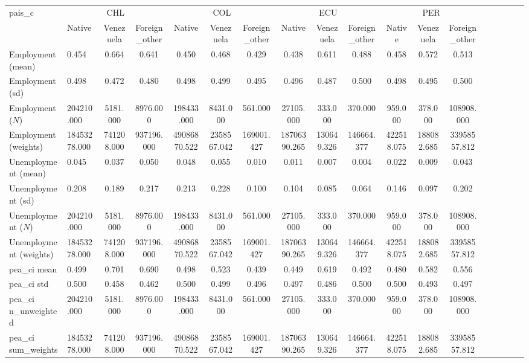 
\begin{landscape}
\begin{table}[htbp]
\centering
\scriptsize
\setlength{\tabcolsep}{3pt}
\begin{tabular}{llcccccccccccccccc}
\toprule
pais_c & \multicolumn{3}{c}{CHL} & \multicolumn{3}{c}{COL} & \multicolumn{3}{c}{ECU} & \multicolumn{3}{c}{PER} \\
 & Native & Venezuela & Foreign_other & Native & Venezuela & Foreign_other & Native & Venezuela & Foreign_other & Native & Venezuela & Foreign_other \\
\midrule
Employment (mean) & 0.454 & 0.664 & 0.641 & 0.450 & 0.468 & 0.429 & 0.438 & 0.611 & 0.488 & 0.458 & 0.572 & 0.513 \\
Employment (sd) & 0.498 & 0.472 & 0.480 & 0.498 & 0.499 & 0.495 & 0.496 & 0.487 & 0.500 & 0.498 & 0.495 & 0.500 \\
Employment ($N$) & 204210.000 & 5181.000 & 8976.000 & 198433.000 & 8431.000 & 561.000 & 27105.000 & 333.000 & 370.000 & 959.000 & 378.000 & 108908.000 \\
Employment (weights) & 18453278.000 & 741208.000 & 937196.000 & 49086870.522 & 2358567.042 & 169001.427 & 18706390.265 & 130649.326 & 146664.377 & 422518.075 & 188082.685 & 33958557.812 \\
Unemployment (mean) & 0.045 & 0.037 & 0.050 & 0.048 & 0.055 & 0.010 & 0.011 & 0.007 & 0.004 & 0.022 & 0.009 & 0.043 \\
Unemployment (sd) & 0.208 & 0.189 & 0.217 & 0.213 & 0.228 & 0.100 & 0.104 & 0.085 & 0.064 & 0.146 & 0.097 & 0.202 \\
Unemployment ($N$) & 204210.000 & 5181.000 & 8976.000 & 198433.000 & 8431.000 & 561.000 & 27105.000 & 333.000 & 370.000 & 959.000 & 378.000 & 108908.000 \\
Unemployment (weights) & 18453278.000 & 741208.000 & 937196.000 & 49086870.522 & 2358567.042 & 169001.427 & 18706390.265 & 130649.326 & 146664.377 & 422518.075 & 188082.685 & 33958557.812 \\
pea_ci mean & 0.499 & 0.701 & 0.690 & 0.498 & 0.523 & 0.439 & 0.449 & 0.619 & 0.492 & 0.480 & 0.582 & 0.556 \\
pea_ci std & 0.500 & 0.458 & 0.462 & 0.500 & 0.499 & 0.496 & 0.497 & 0.486 & 0.500 & 0.500 & 0.493 & 0.497 \\
pea_ci n_unweighted & 204210.000 & 5181.000 & 8976.000 & 198433.000 & 8431.000 & 561.000 & 27105.000 & 333.000 & 370.000 & 959.000 & 378.000 & 108908.000 \\
pea_ci sum_weights & 18453278.000 & 741208.000 & 937196.000 & 49086870.522 & 2358567.042 & 169001.427 & 18706390.265 & 130649.326 & 146664.377 & 422518.075 & 188082.685 & 33958557.812 \\

\end{tabular}
\end{table}
\end{landscape}
